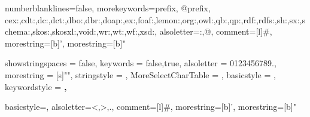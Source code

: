 
\lstset{style=mystyle}

{
    numberblanklines=false,
    morekeywords={prefix, @prefix,
            cex:,cdt:,dc:,dct:,dbo:,dbr:,doap:,ex:,foaf:,lemon:,org:,owl:,qb:,qp:,rdf:,rdfs:,sh:,sx:,schema:,skos:,skosxl:,void:,wr:,wt:,wf:,xsd:},
    alsoletter={:,@},
    comment=[l]{\#},
    morestring=[b]',
    morestring=[b]"
}

\newcommand\JSONnumbervaluestyle{\color{blue}}
\newcommand\JSONstringvaluestyle{\color{red}}

\newif\ifcolonfoundonthisline
\makeatletter

{
    showstringspaces    = false,
    keywords            = {false,true},
    alsoletter          = 0123456789.,
    morestring          = [s]{"}{"},
    stringstyle         = \ifcolonfoundonthisline\JSONstringvaluestyle\fi,
    MoreSelectCharTable =%
    \colon@json{\processColon@json},
    basicstyle          = \ttfamily,
    keywordstyle        = \ttfamily\bfseries,
}

{
    basicstyle=\ttfamily\scriptsize,
    alsoletter={<,>,.},
    comment=[l]{\#},
    morestring=[b]',
    morestring=[b]"
}

\newcommand\processColon@json{%
    \colon@json%
    \ifnum\lst@mode=\lst@Pmode%
        \global\colonfoundonthislinetrue%
    \fi
}
